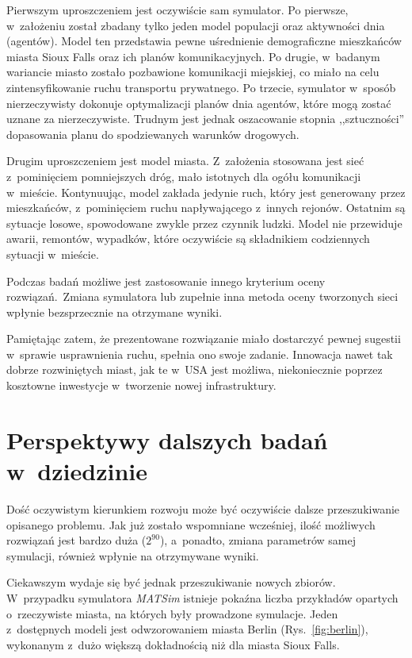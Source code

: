 \documentclass[twoside,12pt]{report}
\begin{document}
Pierwszym uproszczeniem jest oczywiście sam symulator. Po pierwsze, w~założeniu został zbadany tylko jeden model populacji oraz aktywności dnia (agentów). Model ten przedstawia pewne uśrednienie demograficzne mieszkańców miasta Sioux Falls oraz ich planów komunikacyjnych. Po drugie, w~badanym wariancie miasto zostało pozbawione komunikacji miejskiej, co miało na celu zintensyfikowanie ruchu transportu prywatnego. Po trzecie, symulator w~sposób nierzeczywisty dokonuje optymalizacji planów dnia agentów, które mogą zostać uznane za nierzeczywiste. Trudnym jest jednak oszacowanie stopnia ,,sztuczności'' dopasowania planu do spodziewanych warunków drogowych.

Drugim uproszczeniem jest model miasta. Z~założenia stosowana jest sieć z~pominięciem pomniejszych dróg, mało istotnych dla ogółu komunikacji w~mieście. Kontynuując, model zakłada jedynie ruch, który jest generowany przez mieszkańców, z~pominięciem ruchu napływającego z~innych rejonów. Ostatnim są sytuacje losowe, spowodowane zwykle przez czynnik ludzki. Model nie przewiduje awarii, remontów, wypadków, które oczywiście są składnikiem codziennych sytuacji w~mieście. 

Podczas badań możliwe jest zastosowanie innego kryterium oceny rozwiązań.~Zmiana symulatora lub zupełnie inna metoda oceny tworzonych sieci wpłynie bezsprzecznie na otrzymane wyniki.

Pamiętając zatem, że prezentowane rozwiązanie miało  dostarczyć pewnej sugestii w~sprawie usprawnienia ruchu, spełnia ono swoje zadanie. Innowacja nawet tak dobrze rozwiniętych miast, jak te w~USA jest możliwa, niekoniecznie poprzez kosztowne inwestycje w~tworzenie nowej infrastruktury. 

\section{Perspektywy dalszych badań w~dziedzinie}
Dość oczywistym kierunkiem rozwoju może być oczywiście dalsze przeszukiwanie opisanego problemu. Jak już zostało wspomniane wcześniej, ilość możliwych rozwiązań jest bardzo duża ($2^{90}$), a~ponadto, zmiana parametrów samej symulacji, również wpłynie na otrzymywane wyniki.

Ciekawszym wydaje się być jednak przeszukiwanie nowych zbiorów. W~przypadku symulatora \textit{MATSim} istnieje pokaźna liczba przykładów opartych o~rzeczywiste miasta, na których były prowadzone symulacje. Jeden z~dostępnych modeli jest odwzorowaniem miasta Berlin (Rys.~\ref{fig:berlin}), wykonanym z~dużo większą dokładnością niż dla miasta Sioux Falls.
\end{document}
